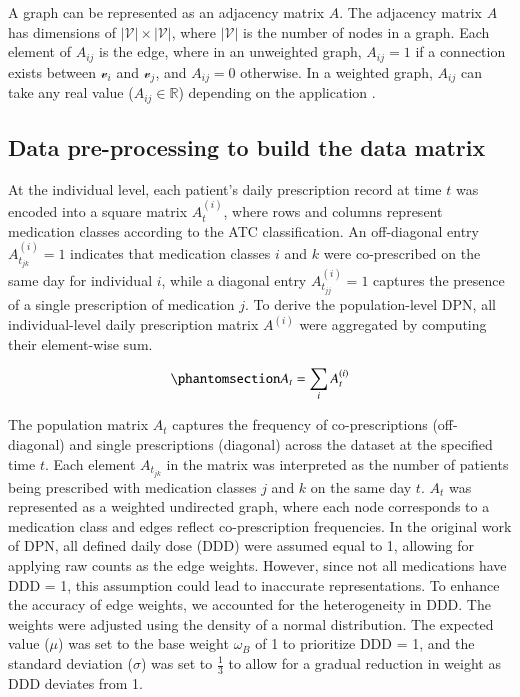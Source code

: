 \documentclass[
  authoryear,
  review]{elsarticle}
\begin{document}
A graph can be represented as an adjacency matrix \(A\). The adjacency
matrix \(A\) has dimensions of \(|\mathcal{V}| \times |\mathcal{V}|\),
where \(|\mathcal{V}|\) is the number of nodes in a graph. Each element
of \(A_{ij}\) is the edge, where in an unweighted graph, \(A_{ij} = 1\)
if a connection exists between \(\mathcal{v}_i\) and \(\mathcal{v}_j\),
and \(A_{ij} = 0\) otherwise. In a weighted graph, \(A_{ij}\) can take
any real value (\(A_{ij} \in \mathbb{R}\)) depending on the application
\citep{estrada2012structure}.

\subsection{Data pre-processing to build the data
matrix}\label{data-pre-processing-to-build-the-data-matrix}

At the individual level, each patient's daily prescription record at
time \(t\) was encoded into a square matrix \(A_t^{(i)}\), where rows
and columns represent medication classes according to the ATC
classification. An off-diagonal entry \(A_{t_{jk}}^{(i)} = 1\) indicates
that medication classes \(i\) and \(k\) were co-prescribed on the same
day for individual \(i\), while a diagonal entry
\(A_{t_{jj}}^{(i)} = 1\) captures the presence of a single prescription
of medication \(j\). To derive the population-level DPN, all
individual-level daily prescription matrix \(A^{(i)}\) were aggregated
by computing their element-wise sum.

\begin{equation}\phantomsection\label{eq-DPN}{A_t = \displaystyle \sum_i A_t^{(i)}}\end{equation}

The population matrix \(A_t\) captures the frequency of co-prescriptions
(off-diagonal) and single prescriptions (diagonal) across the dataset at
the specified time \(t\). Each element \(A_{t_{jk}}\) in the matrix was
interpreted as the number of patients being prescribed with medication
classes \(j\) and \(k\) on the same day \(t\). \(A_t\) was represented
as a weighted undirected graph, where each node corresponds to a
medication class and edges reflect co-prescription frequencies. In the
original work of DPN, all defined daily dose (DDD) were assumed equal to
1, allowing for applying raw counts as the edge weights. However, since
not all medications have DDD = 1, this assumption could lead to
inaccurate representations. To enhance the accuracy of edge weights, we
accounted for the heterogeneity in DDD. The weights were adjusted using
the density of a normal distribution. The expected value (\(\mu\)) was
set to the base weight \(\omega_B\) of 1 to prioritize DDD = 1, and the
standard deviation (\(\sigma\)) was set to \(\frac{1}{3}\) to allow for
a gradual reduction in weight as DDD deviates from 1.
\end{document}
